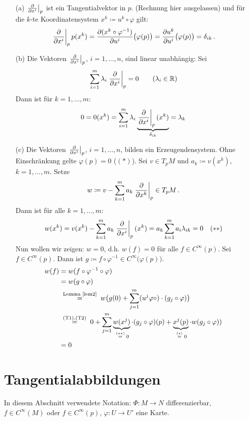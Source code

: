 \documentclass[a4paper,twoside,DIV15,BCOR12mm]{scrbook}
\renewcommand{\da}{\coloneqq}
\begin{document}
\begin{beweis}
\begin{enumerate}
\item[(a)] $\left.\frac{\partial}{\partial x^{i}}\right|_p$ ist ein Tangentialvektor in $p$. (Rechnung hier ausgelassen) und für die $k$-te Koordinatensystem $x^k\da u^k\circ \varphi$ gilt:
\[
\left.\frac{\partial}{\partial x^{i}}\right|_pp(x^k) = \frac{\partial (x^k\circ\varphi^{-1})}{\partial u^i}\bigl(\varphi(p)\bigr) = \frac{\partial u^k}{\partial u^i}\bigl(\varphi(p)\bigr) = \delta_{ik}\,.
\]
\item[(b)] Die Vektoren $\left.\frac{\partial}{\partial x^{i}}\right|_p$, $i=1,\ldots,n$, sind linear unabhängig:
Sei 
\[
\sum_{i=1}^m \lambda_i \left.\frac{\partial}{\partial x^{i}}\right|_p = 0 
\qquad (\lambda_i\in\mathbb{R})
\]
Dann ist für $k=1,\ldots,m$:
\[
0 = 0(x^k) = 
\sum_{i=1}^m \lambda_i \underbrace{\left.\frac{\partial}{\partial x^{i}}\right|_p(x^k)}_{\delta_{ik}} = \lambda_k
\]
\item[(c)]  Die Vektoren $\left.\frac{\partial}{\partial x^{i}}\right|_p$, $i=1,\ldots,n$, bilden ein Erzeugendensystem. Ohne Einschränkung gelte $\varphi(p)=0$ ($(*)$). Sei $v\in T_pM$ und $a_k \da v(x^k)$, $k=1,\ldots,m$. Setze 
\[w\da v-\sum_{k=1}^m a_k \ptv{k} \in T_pM\,.\]
Dann ist für alle $k=1,\ldots,m$: 
\[
w(x^k) = v(x^k) - \sum_{k=1}^m  a_k \left.\frac{\partial}{\partial x^{i}}\right|_p (x^k) = a_k \sum_{k=1}^m  a_i \lambda_{ik} = 0 \quad (**)
\]
Nun wollen wir zeigen: $w=0$, d.h. $w(f) = 0$ für alle $f\in C^{\infty}(p)$.
Sei $f\in C^\infty(p)$. Dann ist $g \da f \circ \varphi^{-1} \in C^\infty\bigl(\varphi(p)\bigr)$.
\begin{align*}
w(f) &= w(f \circ \varphi^{-1} \circ \varphi) \\
&= w(g \circ \varphi) \\
&\gleichnach{Lemma \ref{lem2}} w\bigl( g(0) + \sum_{j=1}^m (u^j\varphi \circ)\cdot(g_j \circ \varphi ) \bigr) \\
& \gleichnach{(T1),(T2)} 0 + \sum_{j=1}^m \underbrace{w(x^j)}_{\gleichwegen{(**)}0} \cdot (g_j\circ\varphi)(p) + \underbrace{x^j(p)}_{\gleichwegen{(*)}0} \cdot w(g_j \circ\varphi ) ) \\
& = 0
\end{align*}
\end{enumerate}

\end{beweis}


\section{Tangentialabbildungen}

In diesem Abschnitt verwendete Notation: $\Phi: M\to N$ differenzierbar, $f\in C^\infty(M)$ oder $f\in C^\infty(p)$, $\varphi: U \to U'$ eine Karte.
\end{document}

